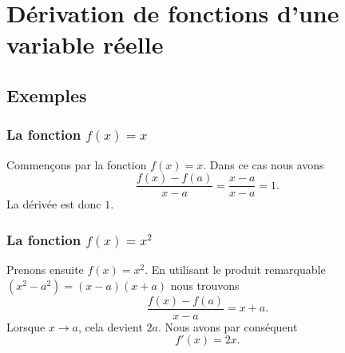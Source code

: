\section{Dérivation de fonctions d'une variable réelle}
\subsection{Exemples}

\subsubsection{La fonction $f(x)=x$}

Commençons par la fonction $f(x)=x$. Dans ce cas nous avons
\begin{equation}
	\frac{ f(x)-f(a) }{ x-a }=\frac{ x-a }{ x-a }=1.
\end{equation}
La dérivée est donc $1$.


\subsubsection{La fonction $f(x)=x^2$}

Prenons ensuite $f(x)=x^2$. En utilisant le produit remarquable $(x^2-a^2)=(x-a)(x+a)$ nous trouvons
\begin{equation}
	\frac{ f(x)-f(a) }{ x-a }=x+a.
\end{equation}
Lorsque $x\to a$, cela devient $2a$. Nous avons par conséquent
\begin{equation}
	f'(x)=2x.
\end{equation}

